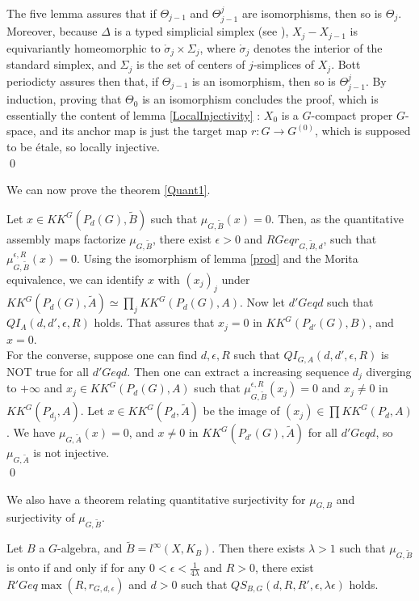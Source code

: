 \begin{dem}
The five lemma assures that if $\Theta_{j-1}$ and $\Theta^j_{j-1}$ are isomorphisms, then so is $\Theta_j$. Moreover, because $\Delta$ is a typed simplicial simplex (see \cite{TuBC2}), $X_j-X_{j-1}$ is equivariantly homeomorphic to $\mathring \sigma_j \times \Sigma_j$, where  $\mathring \sigma _ j $ denotes the interior of the standard simplex, and   $\Sigma_j$ is the set of centers of $j$-simplices of $X_j$. Bott periodicty assures then that, if $\Theta_{j-1}$ is an isomorphism, then so is $\Theta^j_{j-1}$. By induction, proving that $\Theta_0$ is an isomorphism concludes the proof, which is essentially the content of lemma \ref{LocalInjectivity} : $X_0$ is a $G$-compact proper $G$-space, and its anchor map is just the target map $r:G\rightarrow G^{(0)}$, which is supposed to be étale, so locally injective.\\
\qed
\end{dem}

We can now prove the theorem \ref{Quant1}.\\

\begin{dem}
Let $x\in KK^G(P_d(G),\tilde B)$ such that $\mu_{G,\tilde B}(x)=0$. Then, as the quantitative assembly maps factorize $\mu_{G,\tilde B}$, there exist $\epsilon>0$ and $RGeq r_{G,\tilde B,d}$, such that $\mu_{G,\tilde B}^{\epsilon,R}(x)=0$. Using the isomorphism of lemma \ref{prod} and the Morita equivalence, we can identify $x$ with $(x_j)_j$ under $KK^G(P_d(G),\tilde A)\simeq\prod_j KK^G(P_d(G),A)$. Now let $d'Geq d$ such that $QI_{A}(d,d',\epsilon,R)$ holds. That assures that $x_j=0$ in $KK^G(P_{d'}(G),B)$, and $x=0$.\\

For the converse, suppose one can find $d,\epsilon,R$ such that $QI_{G,A}(d,d',\epsilon,R)$ is NOT true for all $d'Geq d$. Then one can extract a increasing sequence $d_j$ diverging to $+\infty$ and $x_j\in KK^G(P_d(G),A)$ such that $\mu_{G,\tilde B}^{\epsilon,R}(x_j)=0$ and $x_j\neq 0$ in $KK^G(P_{d_j},A)$. Let $x\in KK^G(P_d,\tilde A)$ be the image of $(x_j)\in \prod KK^G(P_d,A)$. We have $\mu_{G,\tilde A}(x)=0$, and $x\neq 0$ in $KK^G(P_{d'}(G),\tilde A)$ for all $d'Geq d$, so $\mu_{G,\tilde A}$ is not injective. \\
\qed   
\end{dem}

We also have a theorem relating quantitative surjectivity for $\mu_{G,B}$ and surjectivity of $\mu_{G,\tilde B}$.

\begin{thm}
Let $B$ a $G$-algebra, and $\tilde B = l^\infty(X,K_B)$. Then there exists $\lambda>1$ such that $\mu_{G,\tilde B}$ is onto if and only if for any $0<\epsilon<\frac{1}{4\lambda}$ and $R>0$, there exist $R'Geq \max(R,r_{G,d,\epsilon})$ and $d>0$ such that $QS_{B,G}(d,R,R',\epsilon,\lambda\epsilon)$ holds.
\end{thm}

